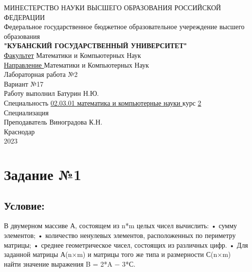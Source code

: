 \documentclass[a4paper]{article}
\begin{document}
\begin{center}
\hfill \break
{\large МИНЕСТЕРСТВО НАУКИ ВЫСШЕГО ОБРАЗОВАНИЯ РОССИЙСКОЙ ФЕДЕРАЦИИ}\\
{\large Федеральное государственное бюджетное образовательное учереждение высшего образования}\\
\hfill \break
{\large \textbf{"КУБАНСКИЙ ГОСУДАРСТВЕННЫЙ УНИВЕРСИТЕТ"}} \\
\hfill \break
{\large \underline {Факультет}}\: Математики и Компьютерных Наук\\
{\large \underline {Направление }}\: Математики и Компьютерных Наук\\

\hfill \break
\hfill \break
\hfill \break
{\Large Лабораторная работа №2}\\
{\Large Вариант  №17}\\
\hfill \break \hfill \break
\hfill \break \hfill \break
Работу выполнил \underline{\hspace{7cm}} Батурин Н.Ю.\\
\hfill \break
Специальность \underline{02.03.01 математика и компьютерные науки } курс \underline{ 2}\\
\hfill \break
Специализация \underline{\hspace{11cm}}\\
\hfill \break
Преподаватель \underline{\hspace{6cm}} Виноградова К.Н.\\
\hfill \break
\hfill \break 
\hfill \break \hfill \break
Краснодар\\
2023
\end{center}
\thispagestyle{empty}
\newpage
\begin{center}
\tableofcontents
\end{center}
\newpage
\section{Задание №1} 
\subsection{Условие:}
В двумерном массиве А, состоящем из n*m целых чисел вычислить:\newline
• 	сумму элементов;\newline
• 	количество ненулевых элементов, расположенных по периметру матрицы;\newline
• 	среднее геометрическое чисел, состоящих из различных цифр.\newline
•   Для заданной матрицы А(n×m) и матрицы того же типа и размерности С(n×m) найти значение выражения B = 2*A − 3*С.\newline
\end{document}
